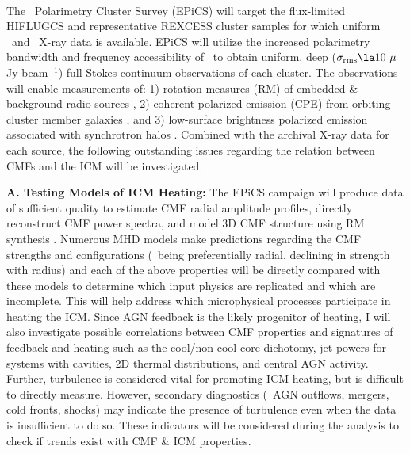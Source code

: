 \documentclass[letterpaper,12pt]{article}
\begin{document}
\\
\indent The \evla\ Polarimetry Cluster Survey (EPiCS) will target the
flux-limited HIFLUGCS \citep{hiflugcs1} and representative REXCESS
\citep{rexcess} cluster samples for which uniform \chandra\ and
\xmm\ X-ray data is available. EPiCS will utilize the increased
polarimetry bandwidth and frequency accessibility of \evla\ to obtain
uniform, deep ($\sigma_{\rm{rms}} \la 10 ~\mu$Jy beam$^{-1}$) full
Stokes continuum observations of each cluster. The observations will
enable measurements of: 1) rotation measures (RM) of embedded \&
background radio sources \citep[see][for method]{2010A&A...513A..30B},
2) coherent polarized emission (CPE) from orbiting cluster member
galaxies \citep[see][for method]{2010NatPh...6..520P}, and 3)
low-surface brightness polarized emission associated with synchrotron
halos \citep[see][for method]{2010ApJ...722..737K}. Combined with the
archival X-ray data for each source, the following outstanding issues
regarding the relation between CMFs and the ICM will be investigated.

{\bf{A. Testing Models of ICM Heating:}} The EPiCS campaign will
produce data of sufficient quality to estimate CMF radial amplitude
profiles, directly reconstruct CMF power spectra, and model 3D CMF
structure using RM synthesis \citep[methods in][]{2003A&A...412..373V,
  2004A&A...424..429M, 2005A&A...441.1217B}. Numerous MHD models make
predictions regarding the CMF strengths and configurations (\eg\ being
preferentially radial, declining in strength with radius) and each of
the above properties will be directly compared with these models to
determine which input physics are replicated and which are
incomplete. This will help address which microphysical processes
participate in heating the ICM. Since AGN feedback is the likely
progenitor of heating, I will also investigate possible correlations
between CMF properties and signatures of feedback and heating such as
the cool/non-cool core dichotomy, jet powers for systems with
cavities, 2D thermal distributions, and central AGN activity. Further,
turbulence is considered vital for promoting ICM heating, but is
difficult to directly measure. However, secondary diagnostics
(\eg\ AGN outflows, mergers, cold fronts, shocks) may indicate the
presence of turbulence even when the data is insufficient to do
so. These indicators will be considered during the analysis to check
if trends exist with CMF \& ICM properties.
\end{document}
